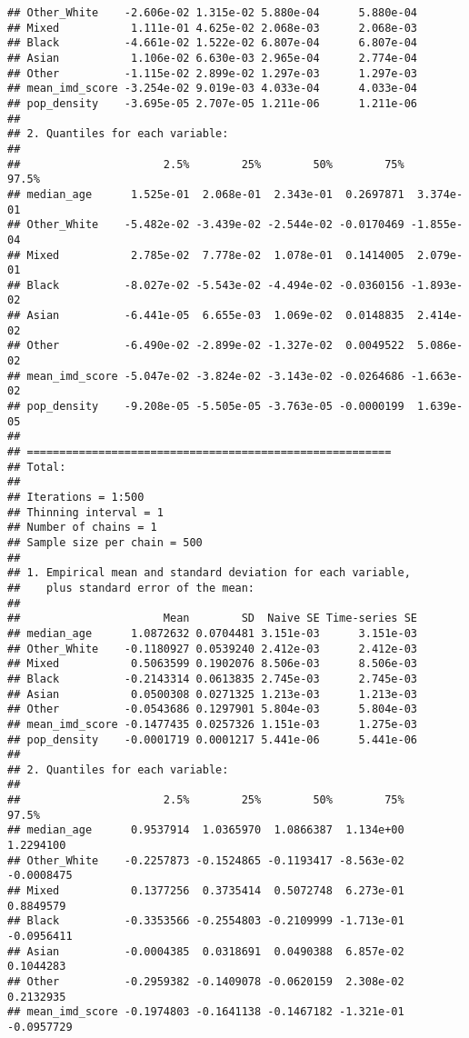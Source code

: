 \documentclass[
]{book}
\begin{document}
\begin{verbatim}
## Other_White    -2.606e-02 1.315e-02 5.880e-04      5.880e-04
## Mixed           1.111e-01 4.625e-02 2.068e-03      2.068e-03
## Black          -4.661e-02 1.522e-02 6.807e-04      6.807e-04
## Asian           1.106e-02 6.630e-03 2.965e-04      2.774e-04
## Other          -1.115e-02 2.899e-02 1.297e-03      1.297e-03
## mean_imd_score -3.254e-02 9.019e-03 4.033e-04      4.033e-04
## pop_density    -3.695e-05 2.707e-05 1.211e-06      1.211e-06
## 
## 2. Quantiles for each variable:
## 
##                      2.5%        25%        50%        75%      97.5%
## median_age      1.525e-01  2.068e-01  2.343e-01  0.2697871  3.374e-01
## Other_White    -5.482e-02 -3.439e-02 -2.544e-02 -0.0170469 -1.855e-04
## Mixed           2.785e-02  7.778e-02  1.078e-01  0.1414005  2.079e-01
## Black          -8.027e-02 -5.543e-02 -4.494e-02 -0.0360156 -1.893e-02
## Asian          -6.441e-05  6.655e-03  1.069e-02  0.0148835  2.414e-02
## Other          -6.490e-02 -2.899e-02 -1.327e-02  0.0049522  5.086e-02
## mean_imd_score -5.047e-02 -3.824e-02 -3.143e-02 -0.0264686 -1.663e-02
## pop_density    -9.208e-05 -5.505e-05 -3.763e-05 -0.0000199  1.639e-05
## 
## ========================================================
## Total:
## 
## Iterations = 1:500
## Thinning interval = 1 
## Number of chains = 1 
## Sample size per chain = 500 
## 
## 1. Empirical mean and standard deviation for each variable,
##    plus standard error of the mean:
## 
##                      Mean        SD  Naive SE Time-series SE
## median_age      1.0872632 0.0704481 3.151e-03      3.151e-03
## Other_White    -0.1180927 0.0539240 2.412e-03      2.412e-03
## Mixed           0.5063599 0.1902076 8.506e-03      8.506e-03
## Black          -0.2143314 0.0613835 2.745e-03      2.745e-03
## Asian           0.0500308 0.0271325 1.213e-03      1.213e-03
## Other          -0.0543686 0.1297901 5.804e-03      5.804e-03
## mean_imd_score -0.1477435 0.0257326 1.151e-03      1.275e-03
## pop_density    -0.0001719 0.0001217 5.441e-06      5.441e-06
## 
## 2. Quantiles for each variable:
## 
##                      2.5%        25%        50%        75%      97.5%
## median_age      0.9537914  1.0365970  1.0866387  1.134e+00  1.2294100
## Other_White    -0.2257873 -0.1524865 -0.1193417 -8.563e-02 -0.0008475
## Mixed           0.1377256  0.3735414  0.5072748  6.273e-01  0.8849579
## Black          -0.3353566 -0.2554803 -0.2109999 -1.713e-01 -0.0956411
## Asian          -0.0004385  0.0318691  0.0490388  6.857e-02  0.1044283
## Other          -0.2959382 -0.1409078 -0.0620159  2.308e-02  0.2132935
## mean_imd_score -0.1974803 -0.1641138 -0.1467182 -1.321e-01 -0.0957729

\end{verbatim}
\end{document}
